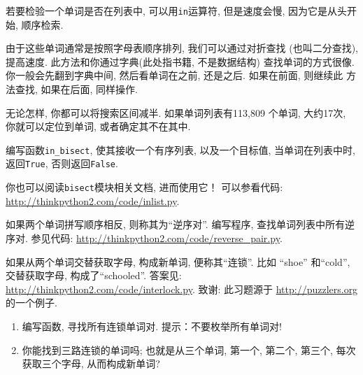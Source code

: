 \documentclass[10pt]{book}
\begin{document}
\begin{exercise}
\label{wordlist1}
\label{bisection}
若要检验一个单词是否在列表中, 可以用{\tt in}运算符, 
但是速度会慢, 因为它是从头开始, 顺序检索. 

由于这些单词通常是按照字母表顺序排列, 我们可以通过对折查找
(也叫二分查找), 提高速度. 此方法和你通过字典(此处指书籍, 不是数据结构)
查找单词的方式很像. 
你一般会先翻到字典中间, 然后看单词在之前, 还是之后. 如果在前面, 则继续此
方法查找, 如果在后面, 同样操作. 

无论怎样, 你都可以将搜索区间减半. 
如果单词列表有113,809 个单词, 大约17次, 你就可以定位到单词, 
或者确定其不在其中.

编写函数\verb"in_bisect",  使其接收一个有序列表, 以及一个目标值, 
当单词在列表中时, 返回{\tt True},  否则返回{\tt False}. 

你也可以阅读{\tt bisect}模块相关文档, 进而使用它！
可以参看代码: \url{http://thinkpython2.com/code/inlist.py}.

\end{exercise}

\begin{exercise}

如果两个单词拼写顺序相反, 则称其为``逆序对''.
编写程序, 查找单词列表中所有逆序对.
参见代码: \url{http://thinkpython2.com/code/reverse_pair.py}.

\end{exercise}

\begin{exercise}
如果从两个单词交替获取字母, 构成新单词, 便称其``连锁''. 
比如 ``shoe'' 和``cold'', 交替获取字母, 构成了``schooled''. 
答案见: \url{http://thinkpython2.com/code/interlock.py}.
致谢: 此习题源于 \url{http://puzzlers.org} 的一个例子.

\begin{enumerate}

\item 编写函数, 寻找所有连锁单词对. 提示：不要枚举所有单词对!

\item 你能找到三路连锁的单词吗; 也就是从三个单词, 第一个, 第二个, 第三个, 
每次获取三个字母, 从而构成新单词?

\end{enumerate}
\end{exercise}
\end{document}
